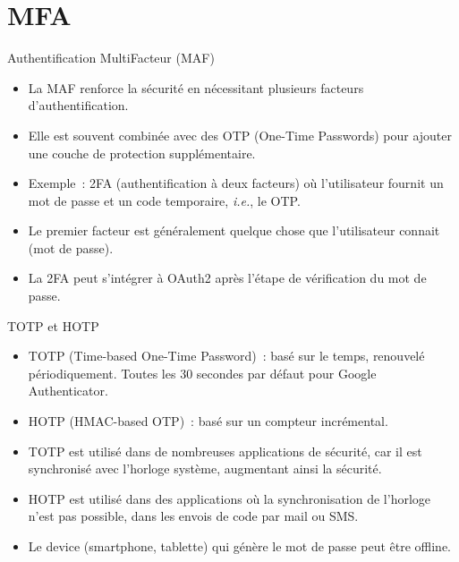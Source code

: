 \documentclass{beamer}
\begin{document}
    \section{MFA}\label{sec:mfa}

    \begin{frame}{Authentification MultiFacteur (MAF)}
        \begin{itemize}
            \item La MAF renforce la sécurité en nécessitant plusieurs facteurs d'authentification.
            \item Elle est souvent combinée avec des OTP (One-Time Passwords) pour ajouter une couche de protection supplémentaire.
            \item Exemple~: 2FA (authentification à deux facteurs) où l'utilisateur fournit un mot de passe et un code temporaire, \textit{i.e.}, le OTP.
            \item Le premier facteur est généralement quelque chose que l'utilisateur connait (mot de passe).
            \item La 2FA peut s'intégrer à OAuth2 après l'étape de vérification du mot de passe.
        \end{itemize}
    \end{frame}

    \begin{frame}{TOTP et HOTP}
        \begin{itemize}
            \item TOTP (Time-based One-Time Password)~: basé sur le temps, renouvelé périodiquement.
            Toutes les 30 secondes par défaut pour Google Authenticator.
            \item HOTP (HMAC-based OTP)~: basé sur un compteur incrémental.
            \item TOTP est utilisé dans de nombreuses applications de sécurité, car il est synchronisé avec l'horloge système, augmentant ainsi la sécurité.
            \item HOTP est utilisé dans des applications où la synchronisation de l'horloge n'est pas possible, dans les envois de code par mail ou SMS.
            \item Le device (smartphone, tablette) qui génère le mot de passe peut être offline.
        \end{itemize}
    \end{frame}
\end{document}
